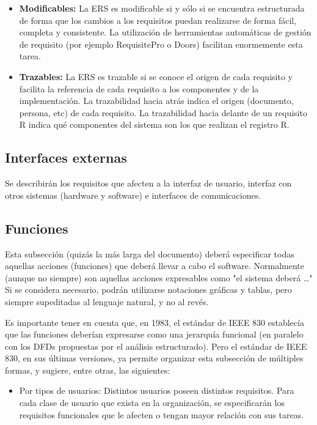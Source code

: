 \documentclass[12pt,a4paper, twosite]{article}
\begin{document}
\begin{itemize}
\begin{itemize}
\item \textbf{Modificables:} La ERS es modificable si y sólo si se encuentra
estructurada de forma que los cambios a los requisitos puedan
realizarse de forma fácil, completa y consistente. La utilización
de herramientas automáticas de gestión de requisito (por ejemplo
RequisitePro o Doors) facilitan enormemente esta tarea.

\item \textbf{Trazables:} La ERS es trazable si se conoce el origen de cada
requisito y facilita la referencia de cada requisito a los
componentes y de la implementación. La trazabilidad hacia atrás
indica el origen (documento, persona, etc) de cada requisito. La
trazabilidad hacia delante de un requisito R indica qué
componentes del sistema son los que realizan el registro R.
\end{itemize}
\end{itemize}


\subsection{Interfaces externas}
\label{sec:orgfd5391f}

Se describirán los requisitos que afecten a la interfaz de usuario,
interfaz con otros sistemas (hardware y software) e interfaces de comunicaciones.


\subsection{Funciones}
\label{sec:org307bb59}

Esta subsección (quizás la más larga del documento) deberá
especificar todas aquellas acciones (funciones) que deberá llevar a
cabo el software. Normalmente (aunque no siempre) son aquellas
acciones expresables como "el sistema deberá \ldots{}" Si se considera
necesario, podrán utilizarse notaciones gráficas y tablas, pero
siempre supeditadas al lenguaje natural, y no al revés.

Es importante tener en cuenta que, en 1983, el estándar de IEEE 830
establecía que las funciones deberían expresarse como una jerarquía
funcional (en paralelo con los DFDs propuestas por el análisis
estructurado). Pero el estándar de IEEE 830, en sus últimas
versiones, ya permite organizar esta subsección de múltiples formas,
y sugiere, entre otras, las siguientes:


\begin{itemize}
\item Por tipos de usuarios: 
    Distintos usuarios poseen distintos requisitos. Para cada clase de
usuario que exista en la organización, se especificarán los
requisitos funcionales que le afecten o tengan mayor relación con
sus tareas.
\end{itemize}
\end{document}
